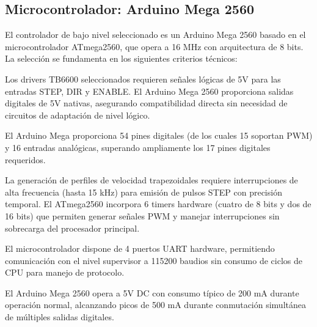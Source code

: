 \subsection{Microcontrolador: Arduino Mega 2560}

El controlador de bajo nivel seleccionado es un Arduino Mega 2560 basado en el microcontrolador ATmega2560, que opera a 16 MHz con arquitectura de 8 bits. La selección se fundamenta en los siguientes criterios técnicos:

Los drivers TB6600 seleccionados requieren señales lógicas de 5V para las entradas STEP, DIR y ENABLE. El Arduino Mega 2560 proporciona salidas digitales de 5V nativas, asegurando compatibilidad directa sin necesidad de circuitos de adaptación de nivel lógico. 

El Arduino Mega proporciona 54 pines digitales (de los cuales 15 soportan PWM) y 16 entradas analógicas, superando ampliamente los 17 pines digitales requeridos.

La generación de perfiles de velocidad trapezoidales requiere interrupciones de alta frecuencia (hasta 15 kHz) para emisión de pulsos STEP con precisión temporal. El ATmega2560 incorpora 6 timers hardware (cuatro de 8 bits y dos de 16 bits) que permiten generar señales PWM y manejar interrupciones sin sobrecarga del procesador principal.

El microcontrolador dispone de 4 puertos UART hardware, permitiendo comunicación con el nivel supervisor a 115200 baudios sin consumo de ciclos de CPU para manejo de protocolo.

El Arduino Mega 2560 opera a 5V DC con consumo típico de 200 mA durante operación normal, alcanzando picos de 500 mA durante conmutación simultánea de múltiples salidas digitales.